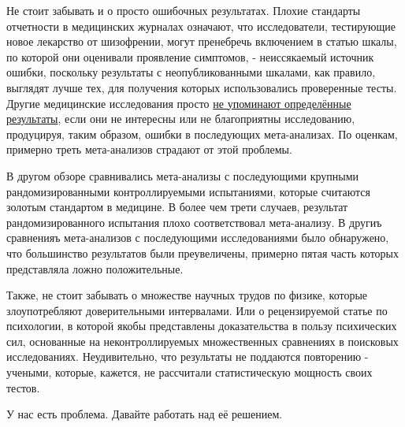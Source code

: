 Не стоит забывать и о просто ошибочных результатах. Плохие стандарты отчетности в медицинских журналах означают, что исследователи, тестирующие новое лекарство от шизофрении, могут пренебречь включением в статью шкалы, по которой они оценивали проявление симптомов, - неиссякаемый источник ошибки, поскольку результаты с неопубликованными шкалами, как правило, выглядят лучше тех, для получения которых использовались проверенные тесты.\cite{marshall_unpublished_2000} Другие медицинские исследования просто \hyperref[chp10:leaveoutdetails]{не упоминают определённые результаты}, если они не интересны или не благоприятны исследованию, продуцируя, таким образом, ошибки в последующих мета-анализах. По оценкам, примерно треть мета-анализов страдают от этой проблемы.\cite{kirkham_impact_2010}

В другом обзоре сравнивались мета-анализы с последующими крупными рандомизированными контроллируемыми испытаниями, которые считаются золотым стандартом в медицине. В более чем трети случаев, результат рандомизированного испытания плохо соответствовал мета-анализу.\cite{lelorier_discrepancies_1997} В другиъ сравненияъ мета-анализов с последующими исследованиями было обнаружено, что большинство результатов были преувеличены, примерно пятая часть которых представляла ложно положительные. \cite{pereira_statistically_2011}

Также, не стоит забывать о множестве научных трудов по физике, которые злоупотребляют доверительными интервалами.\cite{lanzante_cautionary_2005} Или о рецензируемой статье по психологии, в которой якобы представлены доказательства в пользу психических сил, основанные на неконтроллируемых множественных сравнениях в поисковых исследованиях.\cite{wagenmakers_why_2011} Неудивительно, что результаты не поддаются повторению - учеными, которые, кажется, не рассчитали статистическую мощность своих тестов.\cite{galak_correcting_2012}

У нас есть проблема. Давайте работать над её решением.

